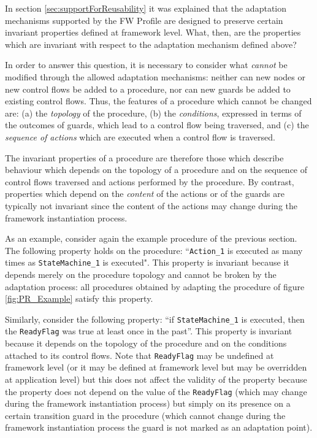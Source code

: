 \documentclass[a4paper,10pt]{article}
\begin{document}
In section \ref{sec:supportForReusability} it was explained that the adaptation mechanisms supported by the FW Profile are designed to preserve certain invariant properties defined at framework level. What, then, are the properties which are invariant with respect to the adaptation mechanism defined above?

In order to answer this question, it is necessary to consider what \emph{cannot} be modified through the allowed adaptation mechanisms: neither can new nodes or new control flows be added to a procedure, nor can new guards be added to existing control flows. Thus, the features of a procedure which cannot be changed are: (a) the \emph{topology} of the procedure, (b) the \emph{conditions}, expressed in terms of the outcomes of guards, which lead to a control flow being traversed, and (c) the \emph{sequence of actions} which are executed when a control flow is traversed.

The invariant properties of a procedure are therefore those which describe behaviour which depends on the topology of a procedure and on the sequence of control flows traversed and actions performed by the procedure. By contrast, properties which depend on the \emph{content} of the actions or of the guards are typically not invariant since the content of the actions may change during the framework instantiation process.

As an example, consider again the example procedure of the previous section. The following
property holds on the procedure: “\texttt{Action\_1} is executed as many times as 
\texttt{StateMachine\_1} is executed". This property is invariant because it depends merely on the procedure topology and cannot be broken by the adaptation process: all procedures obtained by adapting the procedure of figure \ref{fig:PR_Example} satisfy this property.

Similarly, consider the following property: “if \texttt{StateMachine\_1} is executed,
then the \texttt{ReadyFlag} was true at least once in the past”. This property is invariant because it depends on the topology of the procedure and on the conditions attached to its control flows. Note that \texttt{ReadyFlag} may be undefined at framework level (or it may be defined at framework level but may be overridden at application level) but this does not affect the validity of the property because the property does not depend on the value of the \texttt{ReadyFlag} (which may change during the framework instantiation process) but simply on its presence on a certain transition guard in the procedure (which cannot change during the framework instantiation process the guard is not marked as an adaptation point).
\end{document}

